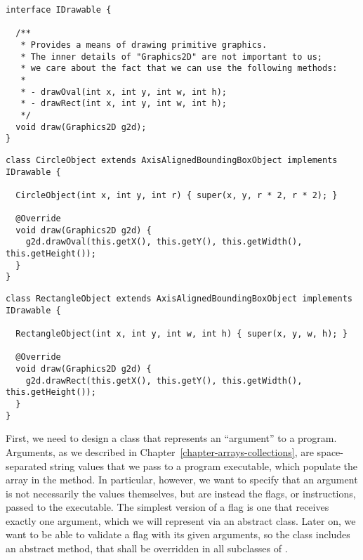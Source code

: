 \enlargethispage{3\baselineskip}
\begin{lstlisting}[language=MyJava]
interface IDrawable {
  
  /**
   * Provides a means of drawing primitive graphics.
   * The inner details of "Graphics2D" are not important to us; 
   * we care about the fact that we can use the following methods:
   * 
   * - drawOval(int x, int y, int w, int h);
   * - drawRect(int x, int y, int w, int h);
   */
  void draw(Graphics2D g2d); 
}
\end{lstlisting} 

\begin{lstlisting}[language=MyJava]
class CircleObject extends AxisAlignedBoundingBoxObject implements IDrawable {
  
  CircleObject(int x, int y, int r) { super(x, y, r * 2, r * 2); }

  @Override
  void draw(Graphics2D g2d) {
    g2d.drawOval(this.getX(), this.getY(), this.getWidth(), this.getHeight());
  }
}
\end{lstlisting}

\begin{lstlisting}[language=MyJava]
class RectangleObject extends AxisAlignedBoundingBoxObject implements IDrawable {
  
  RectangleObject(int x, int y, int w, int h) { super(x, y, w, h); }
  
  @Override
  void draw(Graphics2D g2d) {
    g2d.drawRect(this.getX(), this.getY(), this.getWidth(), this.getHeight());
  }
}
\end{lstlisting}


First, we need to design a class that represents an ``argument'' to a program. Arguments, as we described in Chapter~\ref{chapter-arrays-collections}, are space-separated string values that we pass to a program executable, which populate the  array in the  method. In particular, however, we want to specify that an argument is not necessarily the values themselves, but are instead the flags, or instructions, passed to the executable. The simplest version of a flag is one that receives exactly one argument, which we will represent via an abstract  class. Later on, we want to be able to validate a flag with its given arguments, so the  class includes an abstract  method, that shall be overridden in all subclasses of .

